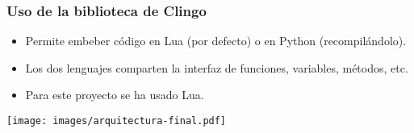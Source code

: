 \begin{frame}
\frametitle{Uso de la biblioteca de Clingo}

\begin{itemize}
	\item<1-> Permite embeber código en Lua (por defecto) o en Python (recompilándolo).
	
	\vspace{0.5em}
	
	\item<2-> Los dos lenguajes comparten la interfaz de funciones, variables, 
	métodos, etc.
	
	\vspace{0.5em}
	
	\item<3-> Para este proyecto se ha usado \textcolor{UDCpink}{Lua}.
\end{itemize}

\vspace{0.5em}

\pause[4]

\centering
\texttt{[image: images/arquitectura-final.pdf]}
\end{frame}